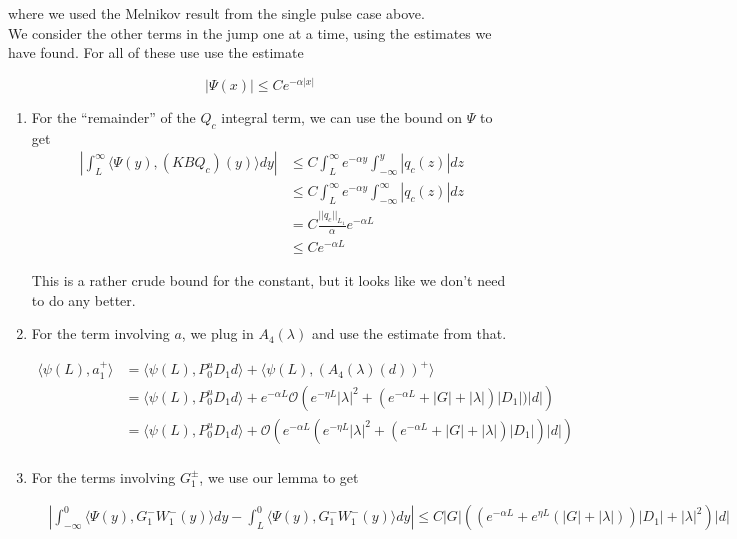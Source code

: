 \documentclass[12pt]{article}
\begin{document}
where we used the Melnikov result from the single pulse case above.\\

We consider the other terms in the jump one at a time, using the estimates we have found. For all of these use use the estimate

\[
|\Psi(x)| \leq C e^{-\alpha|x|}
\]

\begin{enumerate}

\item For the ``remainder'' of the $Q_c$ integral term, we can use the bound on $\Psi$ to get 
\begin{align*}
\left| \int_L^\infty \langle \Psi(y), (K B Q_c)(y) \rangle dy \right| &\leq C \int_L^\infty e^{-\alpha y} \int_{-\infty}^y |q_c(z)| dz\\
&\leq C \int_L^\infty e^{-\alpha y} \int_{-\infty}^\infty |q_c(z)| dz\\
&= C \frac{||q_c||_{L_1}}{\alpha}e^{-\alpha L} \\
&\leq C e^{-\alpha L} 
\end{align*}

This is a rather crude bound for the constant, but it looks like we don't need to do any better.

\item For the term involving $a$, we plug in $A_4(\lambda)$ and use the estimate from that. 

\begin{align*}
\langle \psi(L), a_1^+ \rangle &= \langle \psi(L), P_0^u D_1 d \rangle + \langle \psi(L), (A_4(\lambda)(d))^+\rangle\\
&= \langle \psi(L), P_0^u D_1 d \rangle + e^{-\alpha L} \mathcal{O} \left( e^{-\eta L}|\lambda|^2 + (e^{-\alpha L} + |G| + |\lambda|)|D_1|)|d| \right)\\
&= \langle \psi(L), P_0^u D_1 d \rangle + \mathcal{O} \left( e^{-\alpha L} (e^{-\eta L}|\lambda|^2 + (e^{-\alpha L} + |G| + |\lambda|)|D_1|)|d| \right)\\
\end{align*} 

\item For the terms involving $G_1^\pm$, we use our lemma to get 

\begin{align*}
&\left| \int_{-\infty}^0 \langle \Psi(y), G_1^- W_1^-(y) \rangle dy - \int_L^0 \langle \Psi(y), G_1^- W_1^-(y) \rangle dy\right| \leq C|G| \left( \left( e^{-\alpha L} + e^{\eta L}(|G| + |\lambda|)  \right) |D_1| + |\lambda|^2 \right)|d|
\end{align*}


\end{enumerate}
\end{document}
